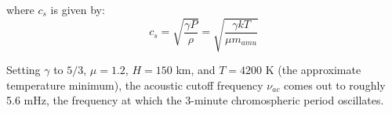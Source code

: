 where $c_{s}$ is given by:
\begin{equation}
    c_{s} = \sqrt{ \frac{ \gamma P }{ \rho }}
    = \sqrt{ \frac{ \gamma k T }{ \mu m_{amu} }}
\end{equation}

Setting $\gamma$ to $5/3$, $\mu = 1.2$, $H = 150$ km,
and $ T = 4200 $ K (the approximate temperature minimum),
the acoustic cutoff frequency $\nu_{ac}$ comes out to roughly
5.6 mHz, the frequency at which the 3-minute chromospheric
period oscillates.





